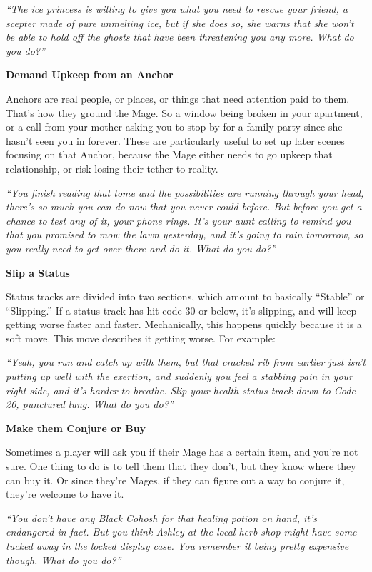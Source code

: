 \documentclass[
  oneside,
  statementpaper,
  9pt]{memoir}
\begin{document}
\emph{``The ice princess is willing to give you what you need to rescue
your friend, a scepter made of pure unmelting ice, but if she does so,
she warns that she won't be able to hold off the ghosts that have been
threatening you any more. What do you do?''}

\textbf{Demand Upkeep from an Anchor}

Anchors are real people, or places, or things that need attention paid
to them. That's how they ground the Mage. So a window being broken in
your apartment, or a call from your mother asking you to stop by for a
family party since she hasn't seen you in forever. These are
particularly useful to set up later scenes focusing on that Anchor,
because the Mage either needs to go upkeep that relationship, or risk
losing their tether to reality.

\emph{``You finish reading that tome and the possibilities are running
through your head, there's so much you can do now that you never could
before. But before you get a chance to test any of it, your phone rings.
It's your aunt calling to remind you that you promised to mow the lawn
yesterday, and it's going to rain tomorrow, so you really need to get
over there and do it. What do you do?''}

\textbf{Slip a Status}

Status tracks are divided into two sections, which amount to basically
``Stable'' or ``Slipping.'' If a status track has hit code 30 or below,
it's slipping, and will keep getting worse faster and faster.
Mechanically, this happens quickly because it is a soft move. This move
describes it getting worse. For example:

\emph{``Yeah, you run and catch up with them, but that cracked rib from
earlier just isn't putting up well with the exertion, and suddenly you
feel a stabbing pain in your right side, and it's harder to breathe.
Slip your health status track down to Code 20, punctured lung. What do
you do?''}

\textbf{Make them Conjure or Buy}

Sometimes a player will ask you if their Mage has a certain item, and
you're not sure. One thing to do is to tell them that they don't, but
they know where they can buy it. Or since they're Mages, if they can
figure out a way to conjure it, they're welcome to have it.

\emph{``You don't have any Black Cohosh for that healing potion on hand,
it's endangered in fact. But you think Ashley at the local herb shop
might have some tucked away in the locked display case. You remember it
being pretty expensive though. What do you do?''}
\end{document}
